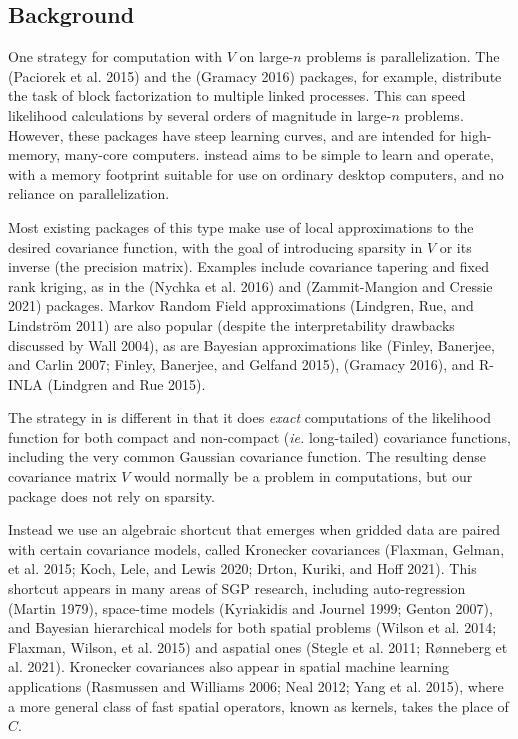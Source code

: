 \hypertarget{background}{%
\subsection{Background}\label{background}}

One strategy for computation with \(V\) on large-\(n\) problems is parallelization. The  (Paciorek et al. 2015) and the  (Gramacy 2016) packages, for example, distribute the task of block factorization to multiple linked processes. This can speed likelihood calculations by several orders of magnitude in large-\(n\) problems. However, these packages have steep learning curves, and are intended for high-memory, many-core computers.  instead aims to be simple to learn and operate, with a memory footprint suitable for use on ordinary desktop computers, and no reliance on parallelization.

Most existing packages of this type make use of local approximations to the desired covariance function, with the goal of introducing sparsity in \(V\) or its inverse (the precision matrix). Examples include covariance tapering and fixed rank kriging, as in the  (Nychka et al. 2016) and  (Zammit-Mangion and Cressie 2021) packages. Markov Random Field approximations (Lindgren, Rue, and Lindström 2011) are also popular (despite the interpretability drawbacks discussed by Wall 2004), as are Bayesian approximations like  (Finley, Banerjee, and Carlin 2007; Finley, Banerjee, and Gelfand 2015),  (Gramacy 2016), and R-INLA (Lindgren and Rue 2015).

The strategy in  is different in that it does \emph{exact} computations of the likelihood function for both compact and non-compact (\emph{ie.} long-tailed) covariance functions, including the very common Gaussian covariance function. The resulting dense covariance matrix \(V\) would normally be a problem in computations, but our package does not rely on sparsity.

Instead we use an algebraic shortcut that emerges when gridded data are paired with certain covariance models, called Kronecker covariances (Flaxman, Gelman, et al. 2015; Koch, Lele, and Lewis 2020; Drton, Kuriki, and Hoff 2021). This shortcut appears in many areas of SGP research, including auto-regression (Martin 1979), space-time models (Kyriakidis and Journel 1999; Genton 2007), and Bayesian hierarchical models for both spatial problems (Wilson et al. 2014; Flaxman, Wilson, et al. 2015) and aspatial ones (Stegle et al. 2011; Rønneberg et al. 2021). Kronecker covariances also appear in spatial machine learning applications (Rasmussen and Williams 2006; Neal 2012; Yang et al. 2015), where a more general class of fast spatial operators, known as kernels, takes the place of \(C\).

